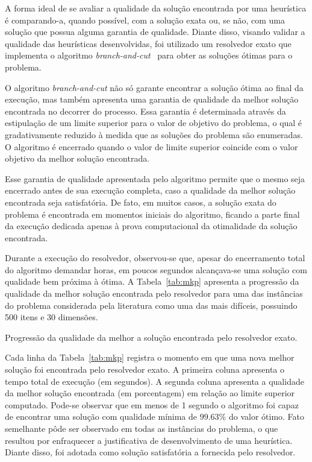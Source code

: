 A forma ideal de se avaliar a qualidade da solução encontrada por uma heurística é comparando-a,
quando possível, com a solução exata ou, se não, com uma solução que possua alguma garantia de qualidade.
Diante disso, visando validar a qualidade das heurísticas desenvolvidas,
foi utilizado um resolvedor exato que implementa o algoritmo \emph{branch-and-cut}~\cite{padberg1991branch,mitchell2002branch} para obter as
soluções ótimas para o problema.

O algoritmo \emph{branch-and-cut} não só garante encontrar a solução ótima ao final da execução,
mas também apresenta uma garantia de qualidade da melhor solução encontrada no decorrer do processo.
Essa garantia é determinada através da estipulação de um limite superior para o
valor de objetivo do problema, o qual é gradativamente reduzido à medida que as soluções
do problema são enumeradas.
O algoritmo é encerrado quando o valor de limite superior coincide com o valor objetivo da
melhor solução encontrada.

Esse garantia de qualidade apresentada pelo algoritmo permite que o mesmo seja encerrado
antes de sua execução completa, caso a qualidade da melhor solução encontrada seja satisfatória.
De fato, em muitos casos, a solução exata do problema é encontrada em momentos iniciais do algoritmo, ficando a parte final da execução dedicada apenas à prova computacional
da otimalidade da solução encontrada.

Durante a execução do resolvedor, observou-se que, apesar do encerramento total do algoritmo
demandar horas, em poucos segundos alcançava-se uma solução com qualidade bem próxima à ótima.
A Tabela~\ref{tab:mkp} apresenta a progressão da qualidade da melhor solução encontrada pelo resolvedor
para uma das instâncias do problema considerada pela literatura como
uma das mais difíceis, possuindo 500 itens e 30 dimensões.
\begin{table}[ht]
  \centering
  
  \caption{Progressão da qualidade da melhor a solução encontrada pelo resolvedor exato.}
  \label{tab:mkp}
\end{table}

Cada linha da Tabela~\ref{tab:mkp} registra o momento em que uma nova melhor solução foi encontrada
pelo resolvedor exato.
A primeira coluna apresenta o tempo total de execução (em segundos).
A segunda coluna apresenta a qualidade da melhor solução encontrada (em porcentagem) em relação ao limite superior computado.
Pode-se observar que em menos de 1 segundo o algoritmo foi capaz de encontrar uma solução com
qualidade mínima de $99.63\%$ do valor ótimo.
Fato semelhante pôde ser observado em todas as instâncias do problema,
o que resultou por enfraquecer a justificativa de desenvolvimento de uma heurística.
Diante disso, foi adotada como solução satisfatória a fornecida pelo resolvedor.

